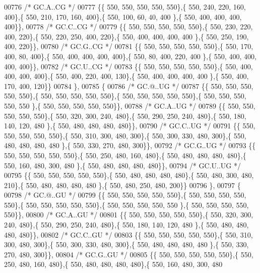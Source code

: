 \begin{DoxyCode}
00776 \textcolor{comment}{/* GC.A..CG */}
00777 \{\{ 550, 550, 550, 550, 550\},\{ 550, 240, 220, 160, 400\},\{ 550, 210, 170, 160, 400\},\{ 550, 100,  60,  40, 400
      \},\{ 550, 400, 400, 400, 400\}\},
00778 \textcolor{comment}{/* GC.C..CG */}
00779 \{\{ 550, 550, 550, 550, 550\},\{ 550, 230, 220, 400, 220\},\{ 550, 220, 250, 400, 220\},\{ 550, 400, 400, 400, 400
      \},\{ 550, 250, 190, 400, 220\}\},
00780 \textcolor{comment}{/* GC.G..CG */}
00781 \{\{ 550, 550, 550, 550, 550\},\{ 550, 170, 400,  80, 400\},\{ 550, 400, 400, 400, 400\},\{ 550,  80, 400, 220, 400
      \},\{ 550, 400, 400, 400, 400\}\},
00782 \textcolor{comment}{/* GC.U..CG */}
00783 \{\{ 550, 550, 550, 550, 550\},\{ 550, 400, 400, 400, 400\},\{ 550, 400, 220, 400, 130\},\{ 550, 400, 400, 400, 400
      \},\{ 550, 400, 170, 400, 120\}\}
00784 \},
00785 \{
00786 \textcolor{comment}{/* GC.@..UG */}
00787 \{\{ 550, 550, 550, 550, 550\},\{ 550, 550, 550, 550, 550\},\{ 550, 550, 550, 550, 550\},\{ 550, 550, 550, 550, 550
      \},\{ 550, 550, 550, 550, 550\}\},
00788 \textcolor{comment}{/* GC.A..UG */}
00789 \{\{ 550, 550, 550, 550, 550\},\{ 550, 320, 300, 240, 480\},\{ 550, 290, 250, 240, 480\},\{ 550, 180, 140, 120, 480
      \},\{ 550, 480, 480, 480, 480\}\},
00790 \textcolor{comment}{/* GC.C..UG */}
00791 \{\{ 550, 550, 550, 550, 550\},\{ 550, 310, 300, 480, 300\},\{ 550, 300, 330, 480, 300\},\{ 550, 480, 480, 480, 480
      \},\{ 550, 330, 270, 480, 300\}\},
00792 \textcolor{comment}{/* GC.G..UG */}
00793 \{\{ 550, 550, 550, 550, 550\},\{ 550, 250, 480, 160, 480\},\{ 550, 480, 480, 480, 480\},\{ 550, 160, 480, 300, 480
      \},\{ 550, 480, 480, 480, 480\}\},
00794 \textcolor{comment}{/* GC.U..UG */}
00795 \{\{ 550, 550, 550, 550, 550\},\{ 550, 480, 480, 480, 480\},\{ 550, 480, 300, 480, 210\},\{ 550, 480, 480, 480, 480
      \},\{ 550, 480, 250, 480, 200\}\}
00796 \},
00797 \{
00798 \textcolor{comment}{/* GC.@..GU */}
00799 \{\{ 550, 550, 550, 550, 550\},\{ 550, 550, 550, 550, 550\},\{ 550, 550, 550, 550, 550\},\{ 550, 550, 550, 550, 550
      \},\{ 550, 550, 550, 550, 550\}\},
00800 \textcolor{comment}{/* GC.A..GU */}
00801 \{\{ 550, 550, 550, 550, 550\},\{ 550, 320, 300, 240, 480\},\{ 550, 290, 250, 240, 480\},\{ 550, 180, 140, 120, 480
      \},\{ 550, 480, 480, 480, 480\}\},
00802 \textcolor{comment}{/* GC.C..GU */}
00803 \{\{ 550, 550, 550, 550, 550\},\{ 550, 310, 300, 480, 300\},\{ 550, 300, 330, 480, 300\},\{ 550, 480, 480, 480, 480
      \},\{ 550, 330, 270, 480, 300\}\},
00804 \textcolor{comment}{/* GC.G..GU */}
00805 \{\{ 550, 550, 550, 550, 550\},\{ 550, 250, 480, 160, 480\},\{ 550, 480, 480, 480, 480\},\{ 550, 160, 480, 300, 480

\end{DoxyCode}
